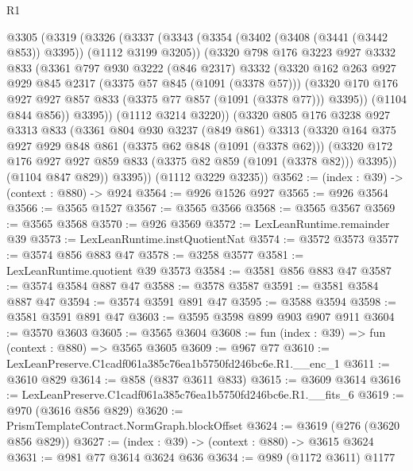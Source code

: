 \begin{lexlean}{R1}
\begin{coremodule}
  @3305
    (@3319
      (@3326
        (@3337
          (@3343
            (@3354 (@3402 (@3408 (@3441 (@3442 @853)) @3395)) (@1112 @3199 @3205))
            (@3320
              @798
              @176
              @3223
              @927
              @3332
              @833
              (@3361
                @797
                @930
                @3222
                (@846 @2317)
                @3332
                (@3320
                  @162
                  @263
                  @927
                  @929
                  @845
                  @2317
                  (@3375 @57 @845 (@1091 (@3378 @57)))
                  (@3320 @170 @176 @927 @927 @857 @833 (@3375 @77 @857 (@1091 (@3378 @77))) @3395))
                (@1104 @844 @856))
              @3395))
          (@1112 @3214 @3220))
        (@3320
          @805
          @176
          @3238
          @927
          @3313
          @833
          (@3361
            @804
            @930
            @3237
            (@849 @861)
            @3313
            (@3320
              @164
              @375
              @927
              @929
              @848
              @861
              (@3375 @62 @848 (@1091 (@3378 @62)))
              (@3320 @172 @176 @927 @927 @859 @833 (@3375 @82 @859 (@1091 (@3378 @82))) @3395))
            (@1104 @847 @829))
          @3395))
      (@1112 @3229 @3235))
@3562 := (index : @39) -> (context : @880) -> @924
@3564 := @926 @1526 @927
@3565 := @926 @3564
@3566 := @3565 @1527
@3567 := @3565 @3566
@3568 := @3565 @3567
@3569 := @3565 @3568
@3570 := @926 @3569
@3572 := LexLeanRuntime.remainder @39
@3573 := LexLeanRuntime.instQuotientNat
@3574 := @3572 @3573
@3577 := @3574 @856 @883 @47
@3578 := @3258 @3577
@3581 := LexLeanRuntime.quotient @39 @3573
@3584 := @3581 @856 @883 @47
@3587 := @3574 @3584 @887 @47
@3588 := @3578 @3587
@3591 := @3581 @3584 @887 @47
@3594 := @3574 @3591 @891 @47
@3595 := @3588 @3594
@3598 := @3581 @3591 @891 @47
@3603 := @3595 @3598 @899 @903 @907 @911
@3604 := @3570 @3603
@3605 := @3565 @3604
@3608 := fun (index : @39) => fun (context : @880) => @3565 @3605
@3609 := @967 @77
@3610 := LexLeanPreserve.C1cadf061a385c76ea1b5750fd246bc6e.R1.__enc_1
@3611 := @3610 @829
@3614 := @858 (@837 @3611 @833)
@3615 := @3609 @3614
@3616 := LexLeanPreserve.C1cadf061a385c76ea1b5750fd246bc6e.R1.__fits_6
@3619 := @970 (@3616 @856 @829)
@3620 := PrismTemplateContract.NormGraph.blockOffset
@3624 := @3619 (@276 (@3620 @856 @829))
@3627 := (index : @39) -> (context : @880) -> @3615 @3624
@3631 := @981 @77 @3614 @3624 @636
@3634 := @989 (@1172 @3611) @1177

\end{coremodule}
\end{lexlean}
